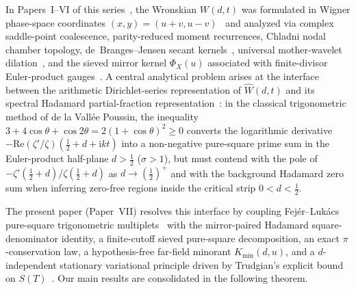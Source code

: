 \documentclass[11pt,reqno]{amsart}
\theoremstyle{definition}
\theoremstyle{remark}
\numberwithin{equation}{section}
\newcommand{\ii}{\mathrm{i}}
\newcommand{\Rea}{\mathrm{Re}}
\begin{document}
In Papers~I--VI of this series~\cite{missiaen2026paper1,missiaen2026paper2,missiaen2026paper3,missiaen2026paper4,missiaen2026paper5,missiaen2026paper6}, the Wronskian $W(d,t)$ was formulated in Wigner phase-space coordinates $(x,y) = (u+v, u-v)$~\cite{wigner1932,hudson1974} and analyzed via complex saddle-point coalescence, parity-reduced moment recurrences, Chladni nodal chamber topology, de~Branges--Jensen secant kernels~\cite{csordas1986}, universal mother-wavelet dilation~\cite{siegel1932,gabcke1979,olver1997}, and the sieved mirror kernel $\Phi_X(u)$ associated with finite-divisor Euler-product gauges~\cite{selberg1942,levinson1974,conrey1989}. A central analytical problem arises at the interface between the arithmetic Dirichlet-series representation of $\widehat{W}(d,t)$ and its spectral Hadamard partial-fraction representation~\cite{hadamard1896,delavalleepoussin1896}: in the classical trigonometric method of de la Vall\'ee Poussin, the inequality $3 + 4\cos\theta + \cos 2\theta = 2(1 + \cos\theta)^2 \ge 0$ converts the logarithmic derivative $-\Rea(\zeta'/\zeta)(\frac{1}{2} + d + \ii kt)$ into a non-negative pure-square prime sum in the Euler-product half-plane $d > \frac{1}{2}$ ($\sigma > 1$), but must contend with the pole of $-\zeta'(\frac{1}{2}+d)/\zeta(\frac{1}{2}+d)$ as $d \to (\frac{1}{2})^+$ and with the background Hadamard zero sum when inferring zero-free regions inside the critical strip $0 < d < \frac{1}{2}$.

The present paper (Paper~VII) resolves this interface by coupling Fej\'er--Luk\'acs pure-square trigonometric multiplets~\cite{fejer1916,szego1975} with the mirror-paired Hadamard square-denominator identity, a finite-cutoff sieved pure-square decomposition, an exact $\pi$-conservation law, a hypothesis-free far-field minorant $K_{\min}(d,u)$, and a $d$-independent stationary variational principle driven by Trudgian's explicit bound on $S(T)$~\cite{trudgian2014}. Our main results are consolidated in the following theorem.
\end{document}
